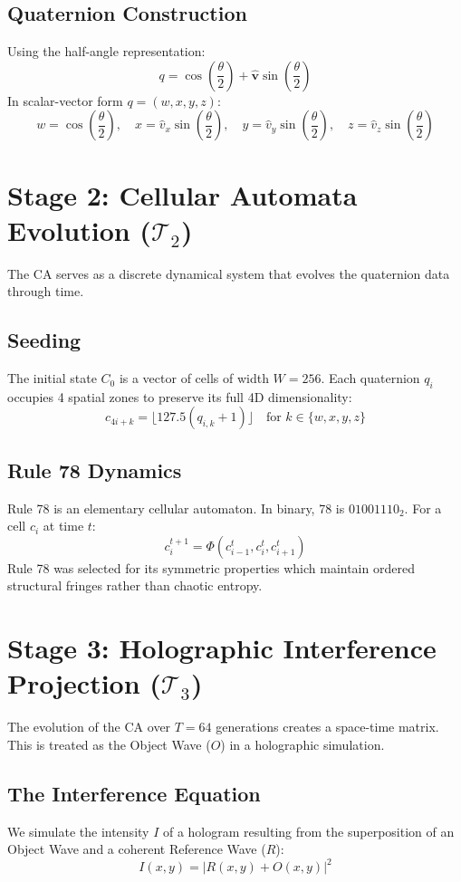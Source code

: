 \documentclass[11pt,a4paper]{article}
\begin{document}
\subsection{Quaternion Construction}
Using the half-angle representation:
\[ q = \cos\left(\frac{\theta}{2}\right) + \hat{\mathbf{v}}\sin\left(\frac{\theta}{2}\right) \]
In scalar-vector form $q = (w, x, y, z)$:
\[ w = \cos\left(\frac{\theta}{2}\right), \quad x = \hat{v}_x \sin\left(\frac{\theta}{2}\right), \quad y = \hat{v}_y \sin\left(\frac{\theta}{2}\right), \quad z = \hat{v}_z \sin\left(\frac{\theta}{2}\right) \]

\section{Stage 2: Cellular Automata Evolution ($\mathcal{T}_2$)}
The CA serves as a discrete dynamical system that evolves the quaternion data through time.

\subsection{Seeding}
The initial state $C_0$ is a vector of cells of width $W=256$. Each quaternion $q_i$ occupies 4 spatial zones to preserve its full 4D dimensionality:
\[ c_{4i+k} = \lfloor 127.5(q_{i,k} + 1) \rfloor \quad \text{for } k \in \{w, x, y, z\} \]

\subsection{Rule 78 Dynamics}
Rule 78 is an elementary cellular automaton. In binary, 78 is $01001110_2$. For a cell $c_i$ at time $t$:
\[ c_i^{t+1} = \Phi(c_{i-1}^t, c_i^t, c_{i+1}^t) \]
Rule 78 was selected for its symmetric properties which maintain ordered structural fringes rather than chaotic entropy.

\section{Stage 3: Holographic Interference Projection ($\mathcal{T}_3$)}
The evolution of the CA over $T=64$ generations creates a space-time matrix. This is treated as the Object Wave ($O$) in a holographic simulation.

\subsection{The Interference Equation}
We simulate the intensity $I$ of a hologram resulting from the superposition of an Object Wave and a coherent Reference Wave ($R$):
\[ I(x, y) = |R(x, y) + O(x, y)|^2 \]
\end{document}
